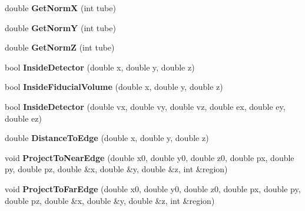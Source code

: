 \begin{DoxyCompactItemize}
\item 
\hypertarget{classANNIEGeometry_ab645d95b1115f411d24baa5dc868b6fb}{double {\bfseries Get\-Norm\-X} (int tube)}\label{classANNIEGeometry_ab645d95b1115f411d24baa5dc868b6fb}

\item 
\hypertarget{classANNIEGeometry_ab674db08c6e04f3f85d82f9135dbe33d}{double {\bfseries Get\-Norm\-Y} (int tube)}\label{classANNIEGeometry_ab674db08c6e04f3f85d82f9135dbe33d}

\item 
\hypertarget{classANNIEGeometry_a8dd59a80f126b58e88ab7d3008cb7001}{double {\bfseries Get\-Norm\-Z} (int tube)}\label{classANNIEGeometry_a8dd59a80f126b58e88ab7d3008cb7001}

\item 
\hypertarget{classANNIEGeometry_a8f607acd58c33b95be136fccd285588d}{bool {\bfseries Inside\-Detector} (double x, double y, double z)}\label{classANNIEGeometry_a8f607acd58c33b95be136fccd285588d}

\item 
\hypertarget{classANNIEGeometry_aad46926236afbfb92498aa1642f21180}{bool {\bfseries Inside\-Fiducial\-Volume} (double x, double y, double z)}\label{classANNIEGeometry_aad46926236afbfb92498aa1642f21180}

\item 
\hypertarget{classANNIEGeometry_a971e6acb3ee5883a3aed577831b053cf}{bool {\bfseries Inside\-Detector} (double vx, double vy, double vz, double ex, double ey, double ez)}\label{classANNIEGeometry_a971e6acb3ee5883a3aed577831b053cf}

\item 
\hypertarget{classANNIEGeometry_a9650b8008ba94cc4b53c59f67406db20}{double {\bfseries Distance\-To\-Edge} (double x, double y, double z)}\label{classANNIEGeometry_a9650b8008ba94cc4b53c59f67406db20}

\item 
\hypertarget{classANNIEGeometry_a3febbe7fd335e9618a02522d8d55a944}{void {\bfseries Project\-To\-Near\-Edge} (double x0, double y0, double z0, double px, double py, double pz, double \&x, double \&y, double \&z, int \&region)}\label{classANNIEGeometry_a3febbe7fd335e9618a02522d8d55a944}

\item 
\hypertarget{classANNIEGeometry_ac3c306909b0de82f5ddcc58de6345b16}{void {\bfseries Project\-To\-Far\-Edge} (double x0, double y0, double z0, double px, double py, double pz, double \&x, double \&y, double \&z, int \&region)}\label{classANNIEGeometry_ac3c306909b0de82f5ddcc58de6345b16}


\end{DoxyCompactItemize}
